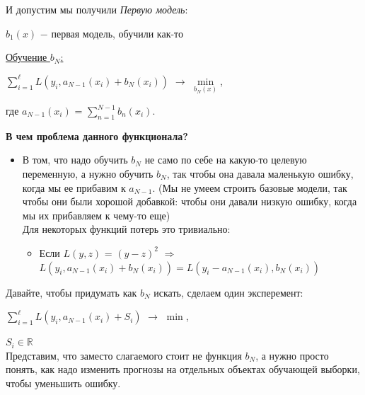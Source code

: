         И допустим мы получили \textit{Первую модель}:
        \begin{center}
            $b_1(x)$ $-$ первая модель, обучили как-то
        \end{center}

        \underline{Обучение $b_N$:}
        \begin{center}
        \Large
            $\sum\limits_{i = 1}^\ell L(y_i, a_{N - 1}(x_i) + b_N(x_i))$ $\longrightarrow$ $\min\limits_{b_N(x)}$,
        \end{center}
        где $a_{N - 1}(x_i)$ = $\sum\limits_{n = 1}^{N - 1}b_n(x_i)$.\\


        \textbf{В чем проблема данного функционала?}
        \begin{itemize}
            \item В том, что надо обучить $b_N$ не само по себе на какую-то целевую переменную, а нужно обучить $b_N$, так чтобы она давала маленькую ошибку, когда мы ее прибавим к $a_{N - 1}$. (Мы не умеем строить базовые модели, так чтобы они были хорошой добавкой: чтобы они давали низкую ошибку, когда мы их прибавляем к чему-то еще)\\

            Для некоторых функций потерь это тривиально:
            \begin{itemize}
                \item Если $L(y, z)$ = $(y - z)^2$ $\Longrightarrow$ $L(y_i, a_{N - 1}(x_i) + b_N(x_i)) = L(y_i - a_{N - 1}(x_i), b_N(x_i))$\\
            \end{itemize}

        \end{itemize}

        Давайте, чтобы придумать как $b_N$ искать, сделаем один эксперемент:
        \begin{center}
        \large
            $\sum\limits_{i = 1}^\ell L(y_i, a_{N-1}(x_i) + S_i)$ $\longrightarrow$ $\min$,
        \end{center}
        $S_i \in \mathbb{R}$\\

        Представим, что заместо слагаемого стоит не функция $b_N$, а нужно просто понять, как надо изменить прогнозы на отдельных объектах обучающей выборки, чтобы уменьшить ошибку.\\

